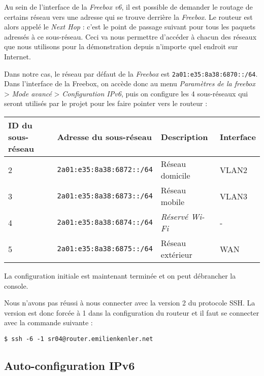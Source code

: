 Au sein de l'interface de la \emph{Freebox v6}, il est possible de demander le routage de certains réseau vers une adresse qui se trouve derrière la \emph{Freebox}.
Le routeur est alors appelé le \emph{Next Hop} : c'est le point de passage suivant pour tous les paquets adressés à ce sous-réseau.
Ceci va nous permettre d'accéder à chacun des réseaux que nous utilisons pour la démonstration depuis n'importe quel endroit sur Internet.

Dans notre cas, le réseau par défaut de la \emph{Freebox} est \texttt{2a01:e35:8a38:6870::/64}.
Dans l'interface de la Freebox, on accède donc au menu \emph{Paramètres de la freebox} > \emph{Mode avancé} > \emph{Configuration IPv6}, puis on configure les 4 sous-réseaux qui seront utilisés par le projet pour les faire pointer vers le routeur :

\begin{center}
    \begin{tabular}{|l|l|l|l|}
    \hline
    ID du sous-réseau & Adresse du sous-réseau           & Description                          & Interface \\ \hline
    2                 & \texttt{2a01:e35:8a38:6872::/64} & Réseau domicile                      & VLAN2     \\ \hline
    3                 & \texttt{2a01:e35:8a38:6873::/64} & Réseau mobile                        & VLAN3     \\ \hline
    4                 & \texttt{2a01:e35:8a38:6874::/64} & \emph{Réservé Wi-Fi}                       & -         \\ \hline
    5                 & \texttt{2a01:e35:8a38:6875::/64} & Réseau extérieur & WAN       \\ \hline
    \end{tabular}
\end{center}


La configuration initiale est maintenant terminée et on peut débrancher la console.

Nous n'avons pas réussi à nous connecter avec la version 2 du protocole SSH.
La version est donc forcée à 1 dans la configuration du routeur et il faut se connecter avec la commande suivante :

\begin{lstlisting}
$ ssh -6 -1 sr04@router.emilienkenler.net
\end{lstlisting}

\subsection{Auto-configuration IPv6}

